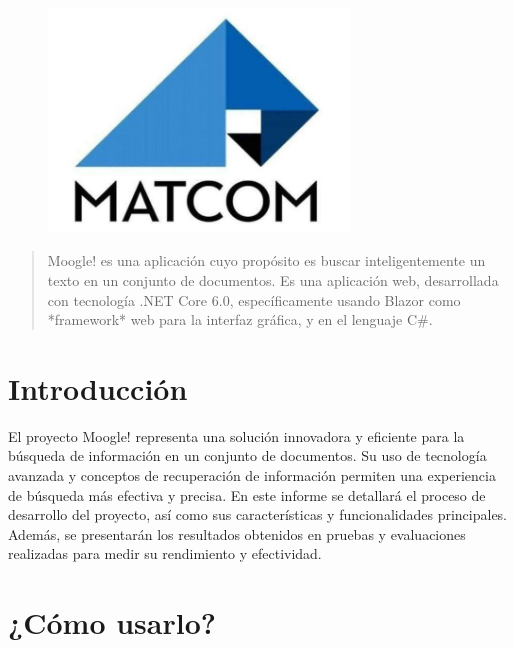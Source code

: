 \documentclass[a4paper, 12pt]{article}
\begin{document}
\begin{center}
\\
\vspace {2cm}
\\
\vspace {1cm}
\\
\vspace {0.5cm}
\\
\vspace {10cm}
\begin{figure}[h]
       \center
       \includegraphics[width=8cm]{matcom.jpg}
\end{figure}
\end{center}

\newpage
\begin{abstract}
Moogle! es una aplicación  cuyo propósito es buscar inteligentemente un texto en un conjunto de documentos. Es una aplicación web, desarrollada con tecnología .NET Core 6.0, específicamente usando Blazor como *framework* web para la interfaz gráfica, y en el lenguaje C\#.
\end{abstract}
\tableofcontents
\newpage

\section{Introducción}\label{sec;intro}
El proyecto Moogle! representa una solución innovadora y eficiente para la búsqueda de información en un conjunto de documentos. Su uso de tecnología avanzada y conceptos de recuperación de información permiten una experiencia de búsqueda más efectiva y precisa. En este informe se detallará el proceso de desarrollo del proyecto, así como sus características y funcionalidades principales. Además, se presentarán los resultados obtenidos en pruebas y evaluaciones realizadas para medir su rendimiento y efectividad.

\newpage
\section{¿Cómo usarlo?}
\end{document}
